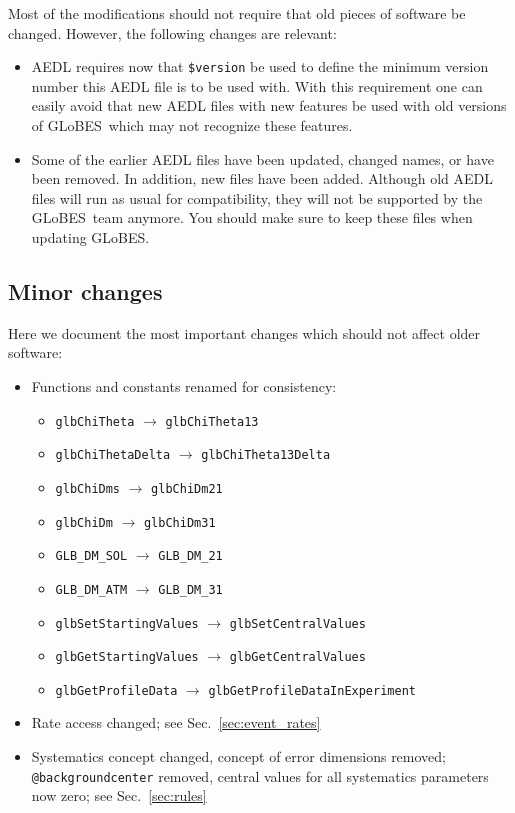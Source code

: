 \documentclass[a4paper,12pt,twoside]{book}
\newcommand{\Sec}{Sec.}
\newcommand{\GLOBES}{{\sf GLoBES}}
\begin{document}
Most of the modifications should not require that old pieces of software be changed. 
However, the following changes are relevant:
\begin{itemize}
\item
 AEDL requires now that {\tt \$version} be used to define the minimum version number this AEDL
file is to be used with. With this requirement one can easily avoid that new AEDL
files with new features be used with old versions of \GLOBES\ which may not recognize these features.
\item
 Some of the earlier AEDL files have been updated, changed names, or have been removed. In addition, new files have been added. Although old AEDL files will run as usual for compatibility, they will not be
supported by the \GLOBES\ team anymore. You should make sure to keep these files when updating \GLOBES . 
\end{itemize}

\subsection*{Minor changes}

Here we document the most important changes which should not affect older software:
\begin{itemize}
\item
 Functions and constants renamed for consistency:
\begin{itemize}
\item
 {\tt glbChiTheta} $\rightarrow$ {\tt glbChiTheta13}
\item
 {\tt glbChiThetaDelta} $\rightarrow$ {\tt glbChiTheta13Delta}
\item
 {\tt glbChiDms} $\rightarrow$ {\tt glbChiDm21}
\item
 {\tt glbChiDm} $\rightarrow$ {\tt glbChiDm31}
\item
 {\tt GLB\_DM\_SOL} $\rightarrow$ {\tt GLB\_DM\_21}
\item
 {\tt GLB\_DM\_ATM} $\rightarrow$ {\tt GLB\_DM\_31}
\item
 {\tt glbSetStartingValues} $\rightarrow$ {\tt glbSetCentralValues}
\item
 {\tt glbGetStartingValues} $\rightarrow$ {\tt glbGetCentralValues}
\item
 {\tt glbGetProfileData} $\rightarrow$ {\tt glbGetProfileDataInExperiment}
\end{itemize}
\item
 Rate access changed; see \Sec~\ref{sec:event_rates}
\item
 Systematics concept changed, concept of error dimensions removed; {\tt @backgroundcenter} removed, central values for all systematics parameters
now zero; see \Sec~\ref{sec:rules}
\end{itemize}
\end{document}
